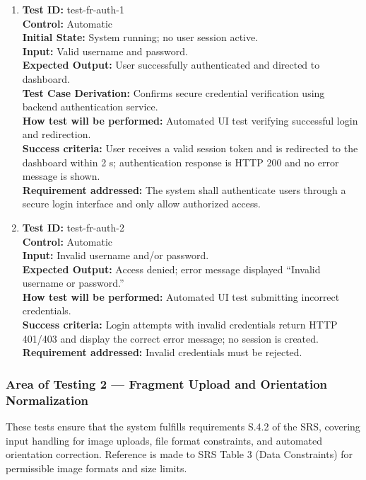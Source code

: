 \documentclass[12pt, titlepage]{article}
\begin{document}
\begin{enumerate}
\item
\textbf{Test ID:} test-fr-auth-1\\
\textbf{Control:} Automatic\\
\textbf{Initial State:} System running; no user session active.\\
\textbf{Input:} Valid username and password.\\
\textbf{Expected Output:} User successfully authenticated and directed to dashboard.\\
\textbf{Test Case Derivation:} Confirms secure credential verification using backend authentication service.\\
\textbf{How test will be performed:} Automated UI test verifying successful login and redirection.\\
\textbf{Success criteria:} User receives a valid session token and is redirected to the dashboard within 2 s; authentication response is HTTP 200 and no error message is shown.\\
\textbf{Requirement addressed:} The system shall authenticate users through a secure login interface and only allow authorized access.\\

\item
\textbf{Test ID:} test-fr-auth-2\\
\textbf{Control:} Automatic\\
\textbf{Input:} Invalid username and/or password.\\
\textbf{Expected Output:} Access denied; error message displayed ``Invalid username or password.''\\
\textbf{How test will be performed:} Automated UI test submitting incorrect credentials.\\
\textbf{Success criteria:} Login attempts with invalid credentials return HTTP 401/403 and display the correct error message; no session is created.\\
\textbf{Requirement addressed:} Invalid credentials must be rejected.\\
\end{enumerate}

\subsubsection{Area of Testing 2 — Fragment Upload and Orientation Normalization}

These tests ensure that the system fulfills requirements S.4.2 of the SRS, covering input handling for image uploads, file format constraints, and automated orientation correction. Reference is made to SRS Table 3 (Data Constraints) for permissible image formats and size limits.
\end{document}
